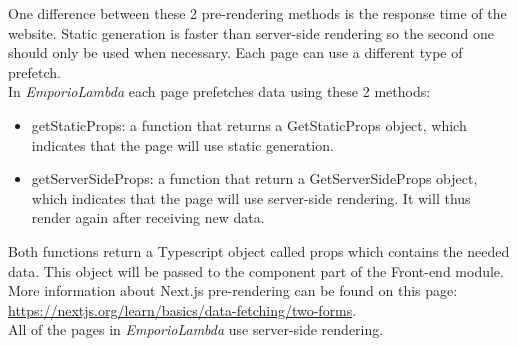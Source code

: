 One difference between these 2 pre-rendering methods is the response time of the website.
Static generation is faster than server-side rendering so the second one should only be used when necessary. Each page can use a different type of prefetch.\\
In \textit{EmporioLambda} each page prefetches data using these 2 methods:
\begin{itemize}
\item getStaticProps: a function that returns a GetStaticProps object, which indicates that the page will use static generation.
\item getServerSideProps: a function that return a GetServerSideProps object, which indicates that the page will use server-side rendering. It will thus render again after receiving new data.
\end{itemize}
Both functions return a Typescript object called props which contains the needed data. This object will be passed to the component part of the Front-end module.\\
More information about Next.js pre-rendering can be found on this page: \url{https://nextjs.org/learn/basics/data-fetching/two-forms}.\\
All of the pages in \textit{EmporioLambda} use server-side rendering.